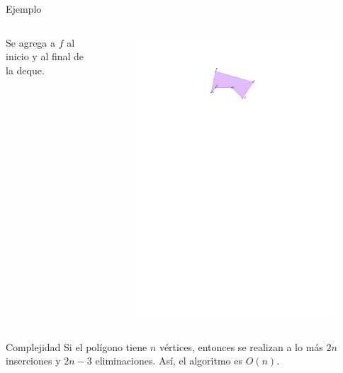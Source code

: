 \documentclass[aspectratio=169,xcolor=dvipsnames, t]{beamer}
\begin{document}
\begin{frame}{Ejemplo}
  \begin{columns}
    \begin{column}{0.5\textwidth}
      Se agrega a $f$ al inicio y al final de la deque.
    \end{column}
    \begin{column}{0.5\textwidth}
      \begin{figure}
        \centering
        \includegraphics[width=\linewidth, height=0.5\textheight, page=13, keepaspectratio]{IPE/Melkman.pdf}
      \end{figure}
    \end{column}
  \end{columns}
\end{frame}
\begin{frame}{Complejidad}
  Si el polígono tiene $n$ vértices, entonces se realizan a lo más $2n$ inserciones y $2n-3$ eliminaciones. Así, el algoritmo es $O(n)$.
\end{frame}
\end{document}
